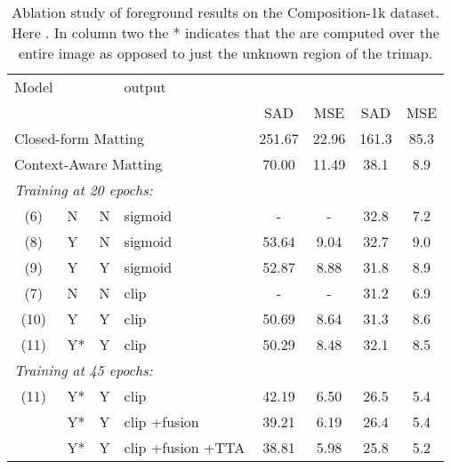 \documentclass[runningheads]{llncs}
\begin{document}
\begin{table}[t]
\centering
\caption{Ablation study of foreground results on the Composition-1k dataset. Here . In column two the * indicates that the  are computed over the entire image as opposed to just the unknown region of the trimap. }
\label{tab:comp1k_fg_ablation}
\setlength{\tabcolsep}{.5em}
\begin{tabular}{clclcccc}
  \toprule
 Model &  & 
  & output &   \multicolumn{2}{c}{ }  &
                                                                         \multicolumn{2}{c}{ } \\
  & & &  &   SAD & MSE       & SAD & MSE  \\ 
  \midrule
   \multicolumn{4}{l}{ Closed-form Matting~\cite{ClosedFormMattingPAMI}} & 251.67 & 22.96 & 161.3 & 85.3 \\ 
   \multicolumn{4}{l}{ Context-Aware Matting~\cite{ContextMatting}} & 70.00 & 11.49 & 38.1 &  8.9\\ 

   \midrule
     \multicolumn{6}{l}{\textit{Training at 20 epochs:} \vspace{.3em}} &  &\\ 
  (6) &     N & N                                                   & sigmoid           & -  &- & 32.8& 7.2\\
  (8) &      Y&N                               & sigmoid           & 53.64        &  9.04    &  32.7& 9.0\\
  (9) &        Y&Y                    & sigmoid           &            52.87                   & 8.88  & 31.8 &  8.9 \\
  (7) &      N&N                                                    & clip              & -                                    & - & 31.2& 6.9\\
  (10) &         Y&Y                       & clip              &        50.69                  & 8.64   &    31.3  & 8.6 \\
  (11)  &         Y* &Y & clip              &                50.29                          &  8.48  & 32.1 &  8.5 \\ \midrule
   \multicolumn{6}{l}{\textit{Training at 45 epochs:} \vspace{.3em}} &  \\ 
  (11)&  Y*&Y  & clip      &  42.19      &     6.50  & 26.5 &  5.4 \\
   \textbf{}& Y*&Y   & clip +fusion     & 39.21       &    6.19  & 26.4 & 5.4   \\
   \textbf{} &Y* &Y   & clip +fusion +TTA  & 38.81        &   5.98  & 25.8 & 5.2\\
\bottomrule
\end{tabular}
\end{table}
\end{document}
